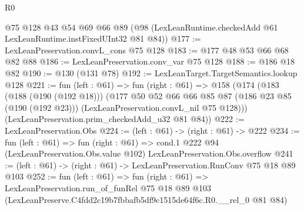 \begin{lexlean}{R0}
\begin{coremodule}
    @75
    @128
    @43
    @54
    @69
    @66
    @89
    (@98 (LexLeanRuntime.checkedAdd @61 LexLeanRuntime.instFixedUInt32 @81 @84))
@177 := LexLeanPreservation.convL_cons @75 @128
@183 := @177 @48 @53 @66 @68 @82 @88
@186 := LexLeanPreservation.conv_var @75 @128
@188 := @186 @18 @82
@190 := @130 (@131 @78)
@192 := LexLeanTarget.TargetSemantics.lookup @128
@221 := fun (left : @61) =>
  fun (right : @61) =>
  @158
    (@174
      (@183
        (@188 (@190 (@192 @18)))
        (@177
          @50
          @52
          @66
          @66
          @85
          @87
          (@186 @23 @85 (@190 (@192 @23)))
          (LexLeanPreservation.convL_nil @75 @128)))
      (LexLeanPreservation.prim_checkedAdd_u32 @81 @84))
@222 := LexLeanPreservation.Obs
@224 := (left : @61) -> (right : @61) -> @222
@234 := fun (left : @61) =>
  fun (right : @61) =>
  cond.{1} @222 @94 (LexLeanPreservation.Obs.value @102) LexLeanPreservation.Obs.overflow
@241 := (left : @61) -> (right : @61) -> LexLeanPreservation.RunConv @75 @18 @89 @103
@252 := fun (left : @61) =>
  fun (right : @61) =>
  LexLeanPreservation.run_of_funRel
    @75
    @18
    @89
    @103
    (LexLeanPreserve.C4fdd2c19b7fbbafb5df9c1515de64f6c.R0.__rel_0 @81 @84)
\end{coremodule}
\end{lexlean}
